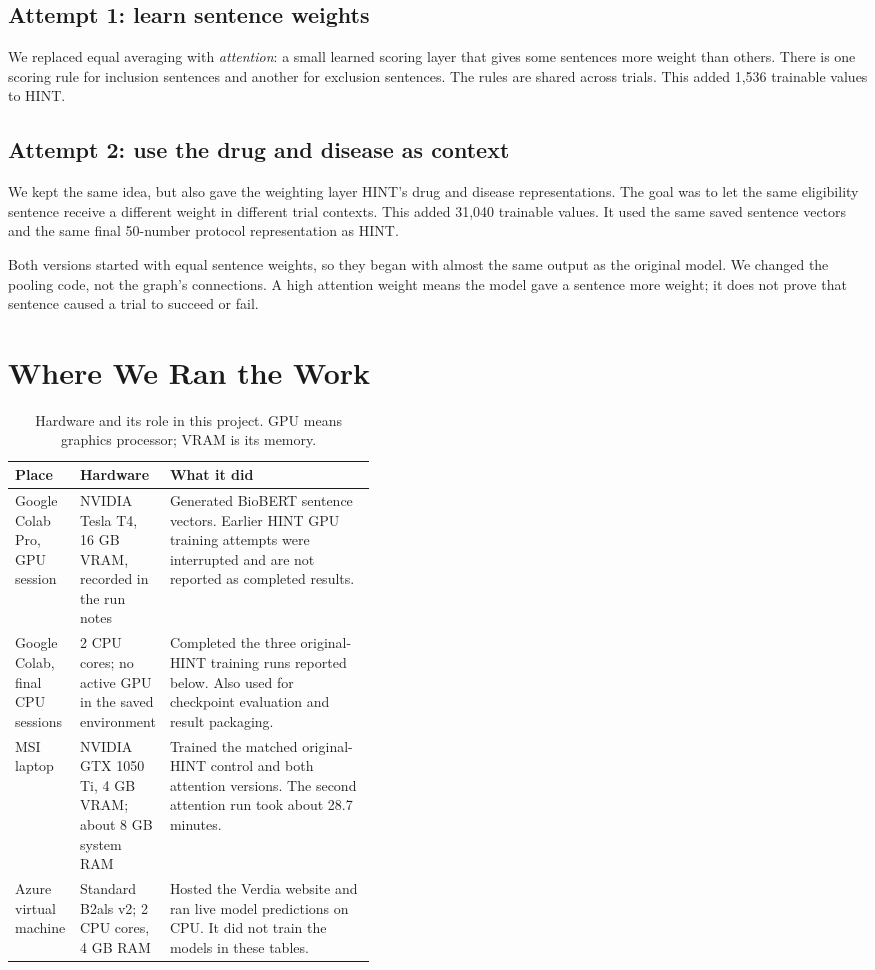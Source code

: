 \documentclass[10pt,letterpaper]{article}
\begin{document}
\subsection{Attempt 1: learn sentence weights}
We replaced equal averaging with \emph{attention}: a small learned scoring layer that gives some sentences more weight than others. There is one scoring rule for inclusion sentences and another for exclusion sentences. The rules are shared across trials. This added 1,536 trainable values to HINT.

\subsection{Attempt 2: use the drug and disease as context}
We kept the same idea, but also gave the weighting layer HINT's drug and disease representations. The goal was to let the same eligibility sentence receive a different weight in different trial contexts. This added 31,040 trainable values. It used the same saved sentence vectors and the same final 50-number protocol representation as HINT.

Both versions started with equal sentence weights, so they began with almost the same output as the original model. We changed the pooling code, not the graph's connections. A high attention weight means the model gave a sentence more weight; it does not prove that sentence caused a trial to succeed or fail.

\section{Where We Ran the Work}
\begin{table}[H]
\centering\small
\caption{Hardware and its role in this project. GPU means graphics processor; VRAM is its memory.}
\begin{tabularx}{\linewidth}{@{}p{0.18\linewidth}p{0.24\linewidth}X@{}}\toprule
Place & Hardware & What it did\\\midrule
Google Colab Pro, GPU session & NVIDIA Tesla T4, 16 GB VRAM, recorded in the run notes & Generated BioBERT sentence vectors. Earlier HINT GPU training attempts were interrupted and are not reported as completed results.\\[4pt]
Google Colab, final CPU sessions & 2 CPU cores; no active GPU in the saved environment & Completed the three original-HINT training runs reported below. Also used for checkpoint evaluation and result packaging.\\[4pt]
MSI laptop & NVIDIA GTX 1050 Ti, 4 GB VRAM; about 8 GB system RAM & Trained the matched original-HINT control and both attention versions. The second attention run took about 28.7 minutes.\\[4pt]
Azure virtual machine & Standard B2als v2; 2 CPU cores, 4 GB RAM & Hosted the Verdia website and ran live model predictions on CPU. It did not train the models in these tables.\\\bottomrule
\end{tabularx}
\end{table}
\end{document}
